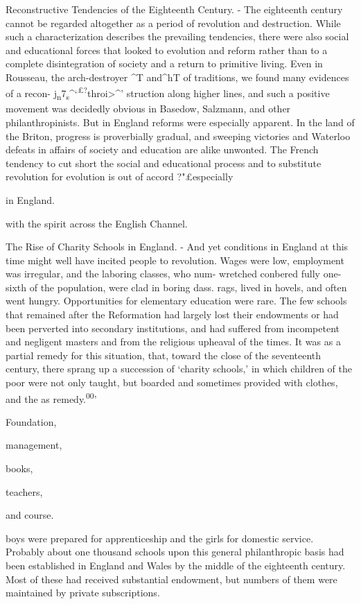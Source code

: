 \documentclass[]{book}
\begin{document}
Reconstructive Tendencies of the Eighteenth Century. - The eighteenth century cannot be regarded altogether as a period of revolution and destruction. While\protect\hypertarget{ch20.xmlux5cux23para.290.1.0.box.130.254.1263.798.q.60}{}{ such a characterization describes the prevailing tendencies, there were also social and educational forces that looked to evolution and reform rather than to a complete disintegration of society and a return to primitive living. Even in Rousseau, the arch-destroyer \^{}T and\^{}hT of traditions, we found many evidences of a recon- j\textsubscript{n}7\textsubscript{s}\^{}`\textsuperscript{£?}throi\textgreater{}\^{}' struction along higher lines, and such a positive movement was decidedly obvious in Basedow, Salzmann, and other philanthropinists. But in England reforms were especially apparent. In the land of the Briton, progress is proverbially gradual, and sweeping victories and Waterloo defeats in affairs of society and education are alike unwonted. The French tendency to cut short the social and educational process and to substitute revolution for evolution is out of accord ?"£especially}

in England.

with the spirit across the English Channel.

The Rise of Charity Schools in England. - And yet conditions in England at this time might well have incited people to revolution. Wages were low, employment was irregular, and the laboring classes, who num- wretched conbered fully one-sixth of the population, were clad in boring dass. rags, lived in hovels, and often went hungry. Opportunities for elementary education were rare. The few schools that remained after the Reformation had largely lost their endowments or had been perverted into secondary institutions, and had suffered from incompetent and negligent masters and from the religious upheaval of the times. It was as a partial remedy for this situation, that, toward the close of the seventeenth century, there sprang up a succession of `charity schools,' in which children of the poor were not only taught, but boarded and sometimes provided with clothes, and the as remedy.\textsuperscript{00}'

Foundation,

management,

books,

teachers,

and course.

boys were prepared for apprenticeship and the girls for domestic service. Probably about one thousand schools upon this general philanthropic basis had been established in England and Wales by the middle of the eighteenth century. Most of these had received substantial endowment, but numbers of them were maintained by private subscriptions.
\end{document}
